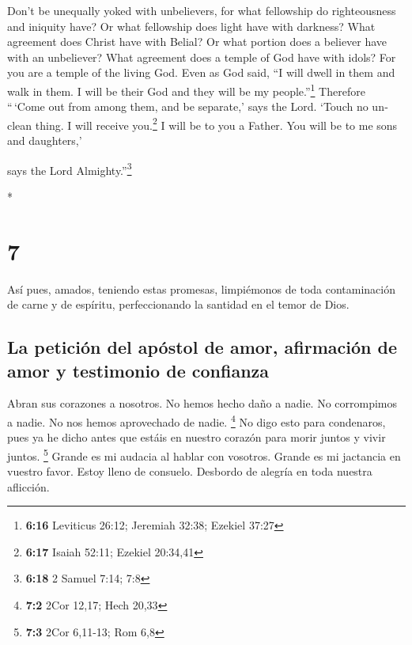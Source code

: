 \begin{paracol}{2}
\begin{otherlanguage}{english}
 Don't be unequally yoked with unbelievers, for what
fellowship do righteousness and iniquity have? Or what fellowship does
light have with darkness?  What agreement does Christ
have with Belial? Or what portion does a believer have with an
unbeliever?  What agreement does a temple of God have
with idols? For you are a temple of the living God. Even as God said,
``I will dwell in them and walk in them. I will be their God and they
will be my people.''\footnote{\textbf{6:16} Leviticus 26:12; Jeremiah
  32:38; Ezekiel 37:27}  Therefore ``\,`Come out from
among them, and be separate,' says the Lord. `Touch no unclean thing. I
will receive you.\footnote{\textbf{6:17} Isaiah 52:11; Ezekiel 20:34,41}
 I will be to you a Father. You will be to me sons and
daughters,'

says the Lord Almighty.''\footnote{\textbf{6:18} 2 Samuel 7:14; 7:8}

\end{otherlanguage}

\switchcolumn[0]*

\hypertarget{section-12}{%
\section{7}\label{section-12}}

 Así pues, amados, teniendo estas promesas, limpiémonos de
toda contaminación de carne y de espíritu, perfeccionando la santidad en
el temor de Dios.

\hypertarget{la-peticiuxf3n-del-apuxf3stol-de-amor-afirmaciuxf3n-de-amor-y-testimonio-de-confianza}{%
\subsection{La petición del apóstol de amor, afirmación de amor y
testimonio de
confianza}\label{la-peticiuxf3n-del-apuxf3stol-de-amor-afirmaciuxf3n-de-amor-y-testimonio-de-confianza}}

 Abran sus corazones a nosotros. No hemos hecho daño a
nadie. No corrompimos a nadie. No nos hemos aprovechado de nadie.
\footnote{\textbf{7:2} 2Cor 12,17; Hech 20,33}  No digo
esto para condenaros, pues ya he dicho antes que estáis en nuestro
corazón para morir juntos y vivir juntos. \footnote{\textbf{7:3} 2Cor
  6,11-13; Rom 6,8}  Grande es mi audacia al hablar con
vosotros. Grande es mi jactancia en vuestro favor. Estoy lleno de
consuelo. Desbordo de alegría en toda nuestra aflicción.


\end{paracol}
